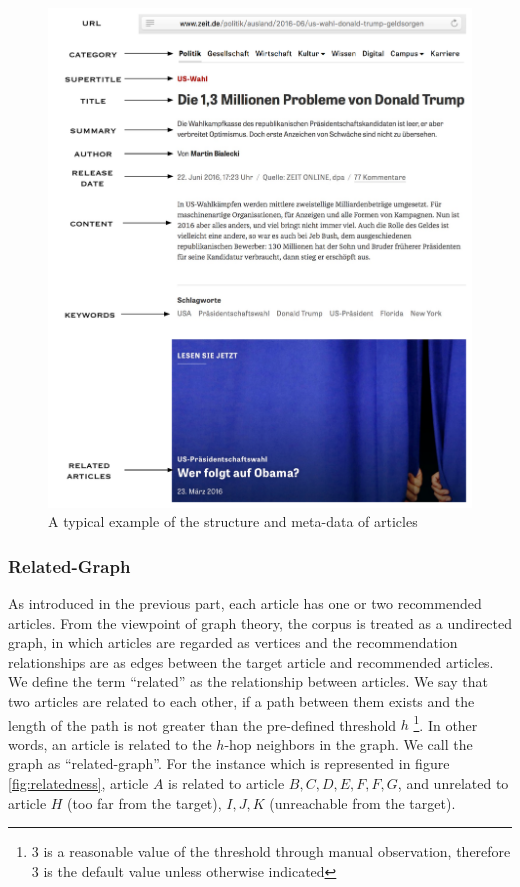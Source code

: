 \begin{figure}[!htb]
\centering
\includegraphics[width=0.8\paperwidth]{fig/article.pdf}
\caption{A typical example of the structure and meta-data of articles}
\label{fig:article_structure}
\end{figure}

\clearpage

\subsubsection{Related-Graph}

As introduced in the previous part, each article has one or two recommended articles. From the viewpoint of graph theory, the corpus is treated as a undirected graph, in which articles are regarded as vertices and the recommendation relationships are as edges between the target article and recommended articles. We define the term ``related'' as the relationship between articles. We say that two articles are related to each other, if a path between them exists and the length of the path is not greater than the pre-defined threshold $h$ \footnote{$3$ is a reasonable value of the threshold through manual observation, therefore $3$ is the default value unless otherwise indicated}. In other words, an article is related to the $h$-hop neighbors in the graph. We call the graph as ``related-graph''. For the instance which is represented in figure \ref{fig:relatedness}, article $A$ is related to article $B, C, D, E, F, F, G$, and unrelated to article $H$ (too far from the target), $I, J, K$ (unreachable from the target). 
 
